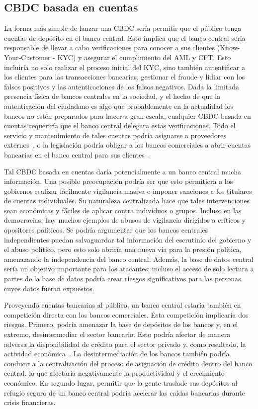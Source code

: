 \documentclass[10pt,spanish]{article}
\begin{document}
\hypertarget{cbdc-basada-en-cuentas}{%
\subsection{CBDC basada en cuentas}\label{cbdc-basada-en-cuentas}}

La forma más simple de lanzar una CBDC sería permitir que el público
tenga cuentas de depósito en el banco central. Esto implica que el banco
central seria responsable de llevar a cabo verificaciones para conocer a
sus clientes (Know-Your-Customer - KYC) y asegurar el cumplimiento del
AML y CFT. Esto incluiría no solo realizar el proceso inicial del KYC,
sino también autentificar a los clientes para las transacciones
bancarias, gestionar el fraude y lidiar con los falsos positivos y las
autenticaciones de los falsos negativos. Dada la limitada presencia
física de bancos centrales en la sociedad, y el hecho de que la
autenticación del ciudadano es algo que probablemente en la actualidad
los bancos no estén preparados para hacer a gran escala, cualquier CBDC
basada en cuentas requeriría que el banco central delegara estas
verificaciones. Todo el servicio y mantenimiento de tales cuentas podría
asignarse a proveedores externos~\cite{Bindseil}, o la legislación
podría obligar a los bancos comerciales a abrir cuentas bancarias en el
banco central para sus clientes~\cite{Berentsen}.

Tal CBDC basada en cuentas daría potencialmente a un banco central mucha
información. Una posible preocupación podría ser que esto permitiera a
los gobiernos realizar fácilmente vigilancia masiva e imponer sanciones
a los titulares de cuentas individuales. Su naturaleza centralizada hace
que tales intervenciones sean económicas y fáciles de aplicar contra
individuos o grupos. Incluso en las democracias, hay muchos ejemplos de
abusos de vigilancia dirigidos a críticos y opositores políticos. Se
podría argumentar que los bancos centrales independientes puedan
salvaguardar tal información del escrutinio del gobierno y el abuso
político, pero esto solo abriría una nueva vía para la presión política,
amenazando la independencia del banco central. Además, la base de datos
central sería un objetivo importante para los atacantes: incluso el
acceso de solo lectura a partes de la base de datos podría crear riesgos
significativos para las personas cuyos datos fueran expuestos.

Proveyendo cuentas bancarias al público, un banco central estaría
también en competición directa con los bancos comerciales. Esta
competición implicaría dos riesgos. Primero, podría amenazar la base de
depósitos de los bancos y, en el extremo, desintermediar el sector
bancario. Esto podría afectar de manera adversa la disponibilidad de
crédito para el sector privado y, como resultado, la actividad
económica~\cite{Agur}. La desintermediación de los bancos también podría
conducir a la centralización del proceso de asignación de crédito dentro
del banco central, lo que afectaría negativamente la productividad y el
crecimiento económico. En segundo lugar, permitir que la gente traslade
sus depósitos al refugio seguro de un banco central podría acelerar las
caídas bancarias durante crisis financieras.
\end{document}

